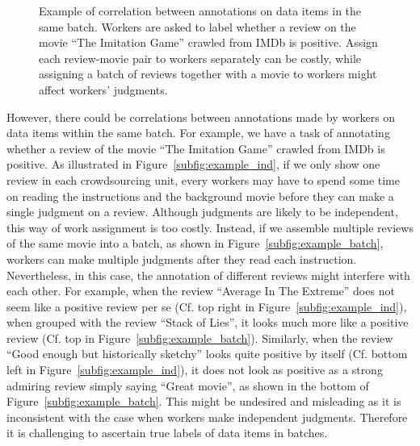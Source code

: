 {\begin{figure}[!t]
{  }
  \caption{\label{fig:example}
  Example of correlation between annotations on data items in the same batch.
  Workers are asked to label whether a review on the movie ``The Imitation Game'' crawled from IMDb is positive.  
  Assign each review-movie pair to workers separately can be costly,
  while assigning a batch of reviews together with a movie to workers might affect workers' judgments. 
  }
\end{figure}
}


However, there could be correlations between annotations made by workers on data items within the same batch.
For example, we have a task of annotating whether a review of the movie ``The Imitation Game'' crawled from IMDb is positive.  
As illustrated in Figure~\ref{subfig:example_ind}, if we only show one review in each crowdsourcing unit, 
every workers may have to spend some time on reading the instructions and the background movie before they can make a single judgment on a review.
Although judgments are likely to be independent, this way of work assignment is too costly.
Instead, if we assemble multiple reviews of the same movie into a batch, as shown in Figure~\ref{subfig:example_batch},
workers can make multiple judgments after they read each instruction.
Nevertheless, in this case, the annotation of different reviews might interfere with each other.  
For example, when the review ``Average In The Extreme'' does not seem like a positive review per se (Cf. top right in Figure~\ref{subfig:example_ind}), 
when grouped with the review ``Stack of Lies'', it looks much more like a positive review (Cf. top in Figure~\ref{subfig:example_batch}).  
Similarly, when the review ``Good enough but historically sketchy'' looks quite positive by itself (Cf. bottom left in Figure~\ref{subfig:example_ind}),  
it does not look as positive as a strong admiring review simply saying ``Great movie'', as shown in the bottom of Figure~\ref{subfig:example_batch}.  
This might be undesired and misleading as it is inconsistent with the case when workers make independent judgments.
Therefore it is challenging to ascertain true labels of data items in batches.




